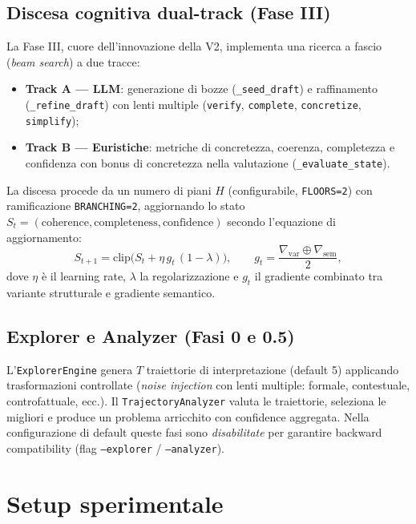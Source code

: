 \documentclass[11pt,a4paper]{article}
\begin{document}
\subsection{Discesa cognitiva dual-track (Fase III)}

La Fase III, cuore dell'innovazione della V2, implementa una ricerca a fascio
(\emph{beam search}) a due tracce:
\begin{itemize}[leftmargin=1.2em]
  \item \textbf{Track A --- LLM}: generazione di bozze (\texttt{\_seed\_draft}) e
        raffinamento (\texttt{\_refine\_draft}) con lenti multiple
        (\texttt{verify}, \texttt{complete}, \texttt{concretize}, \texttt{simplify});
  \item \textbf{Track B --- Euristiche}: metriche di concretezza, coerenza,
        completezza e confidenza con bonus di concretezza nella valutazione
        (\texttt{\_evaluate\_state}).
\end{itemize}
La discesa procede da un numero di piani $H$ (configurabile, \texttt{FLOORS=2})
con ramificazione \texttt{BRANCHING=2}, aggiornando lo stato
$S_t = (\text{coherence}, \text{completeness}, \text{confidence})$ secondo
l'equazione di aggiornamento:
\begin{equation}
  S_{t+1} = \mathrm{clip}\!\bigl(
    S_t + \eta\, g_t\,(1-\lambda)\bigr),\qquad
  g_t = \frac{\nabla_{\mathrm{var}}\oplus\nabla_{\mathrm{sem}}}{2},
  \label{eq:descent}
\end{equation}
dove $\eta$ è il learning rate, $\lambda$ la regolarizzazione e $g_t$ il gradiente
combinato tra variante strutturale e gradiente semantico.

\subsection{Explorer e Analyzer (Fasi 0 e 0.5)}

L'\texttt{ExplorerEngine} genera $T$ traiettorie di interpretazione (default 5)
applicando trasformazioni controllate (\emph{noise injection} con lenti multiple:
formale, contestuale, controfattuale, ecc.). Il \texttt{TrajectoryAnalyzer} valuta le
traiettorie, seleziona le migliori e produce un problema arricchito con confidence
aggregata. Nella configurazione di default queste fasi sono \emph{disabilitate} per
garantire backward compatibility (flag \texttt{--explorer} / \texttt{--analyzer}).

\section{Setup sperimentale}
\label{sec:setup}
\end{document}
